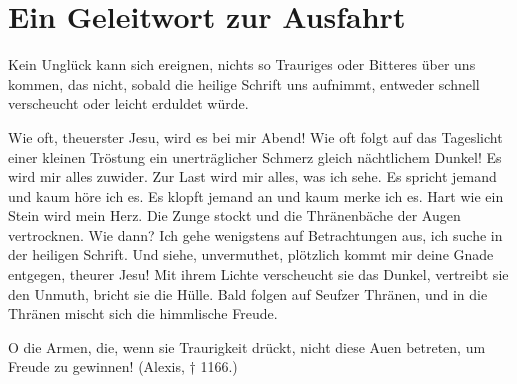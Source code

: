 \chapter[Ein Geleitwort zur Ausfahrt]{Ein Geleitwort zur Ausfahrt}
Kein Unglück kann sich ereignen, nichts so Trauriges oder Bitteres über uns kommen, das nicht, sobald die heilige Schrift uns aufnimmt, entweder schnell verscheucht oder leicht erduldet würde.

Wie oft, theuerster Jesu, wird es bei mir Abend! Wie oft folgt auf das Tageslicht einer kleinen Tröstung ein unerträglicher Schmerz gleich nächtlichem Dunkel! Es wird mir alles zuwider. Zur Last wird mir alles, was ich sehe. Es spricht jemand und kaum höre ich es. Es klopft jemand an und kaum merke ich es. Hart wie ein Stein wird mein Herz. Die Zunge stockt und die Thränenbäche der Augen vertrocknen. Wie dann? Ich gehe wenigstens auf Betrachtungen aus, ich suche in der heiligen Schrift. Und siehe, unvermuthet, plötzlich kommt mir deine Gnade entgegen, theurer Jesu! Mit ihrem Lichte verscheucht sie das Dunkel, vertreibt sie den Unmuth, bricht sie die Hülle. Bald folgen auf Seufzer Thränen, und in die Thränen mischt sich die himmlische Freude.

O die Armen, die, wenn sie Traurigkeit drückt, nicht diese Auen betreten, um Freude zu gewinnen! (Alexis, † 1166.)
